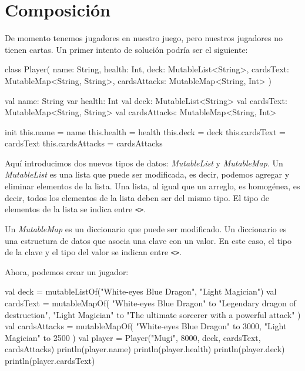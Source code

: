 \section{Composición}

  De momento tenemos jugadores en nuestro juego, pero nuestros jugadores no tienen cartas.
  Un primer intento de solución podría ser el siguiente:

  \begin{kotlin}
    class Player(
      name: String,
      health: Int,
      deck: MutableList<String>,
      cardsText: MutableMap<String, String>,
      cardsAttacks: MutableMap<String, Int>
    ) {
      val name: String
      var health: Int
      val deck: MutableList<String>
      val cardsText: MutableMap<String, String>
      val cardsAttacks: MutableMap<String, Int>

      init {
        this.name = name
        this.health = health
        this.deck = deck
        this.cardsText = cardsText
        this.cardsAttacks = cardsAttacks
      }
    }
  \end{kotlin}

  Aquí introducimos dos nuevos tipos de datos: 
  \textit{MutableList}\autocite{MutableListKotlinProgramming} y 
  \textit{MutableMap}.\autocite{MutableMapKotlinProgramming}
  Un \textit{MutableList} es una lista que puede ser modificada, es decir, podemos agregar y
  eliminar elementos de la lista.
  Una lista, al igual que un arreglo, es homogénea, es decir, todos los elementos de la lista
  deben ser del mismo tipo.
  El tipo de elementos de la lista se indica entre \texttt{<>}.

  Un \textit{MutableMap} es un diccionario que puede ser modificado.
  Un diccionario es una estructura de datos que asocia una clave con un valor.
  En este caso, el tipo de la clave y el tipo del valor se indican entre \texttt{<>}.

  Ahora, podemos crear un jugador:

  \begin{kotlin}
    val deck = mutableListOf("White-eyes Blue Dragon", "Light Magician")
    val cardsText = mutableMapOf(
      "White-eyes Blue Dragon" to "Legendary dragon of destruction",
      "Light Magician" to "The ultimate sorcerer with a powerful attack"
    )
    val cardsAttacks = mutableMapOf(
      "White-eyes Blue Dragon" to 3000,
      "Light Magician" to 2500
    )
    val player = Player("Mugi", 8000, deck, cardsText, cardsAttacks)
    println(player.name)
    println(player.health)
    println(player.deck)
    println(player.cardsText)
  \end{kotlin}

